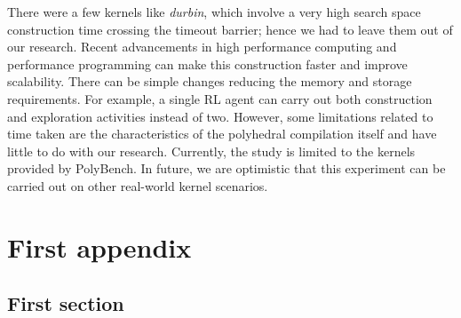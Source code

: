 \documentclass[logo,msc]{infthesis}           %
\begin{document}
There were a few kernels like \textit{durbin}, which involve a very high search space construction time crossing the timeout barrier; hence we had to leave them out of our research. Recent advancements in high performance computing and performance programming can make this construction faster and improve scalability. There can be simple changes reducing the memory and storage requirements. For example, a single RL agent can carry out both construction and exploration activities instead of two. However, some limitations related to time taken are the characteristics of the polyhedral compilation itself and have little to do with our research. Currently, the study is limited to the kernels provided by PolyBench. In future, we are optimistic that this experiment can be carried out on other real-world kernel scenarios.







\appendix

\chapter{First appendix}

\section{First section}
\end{document}
